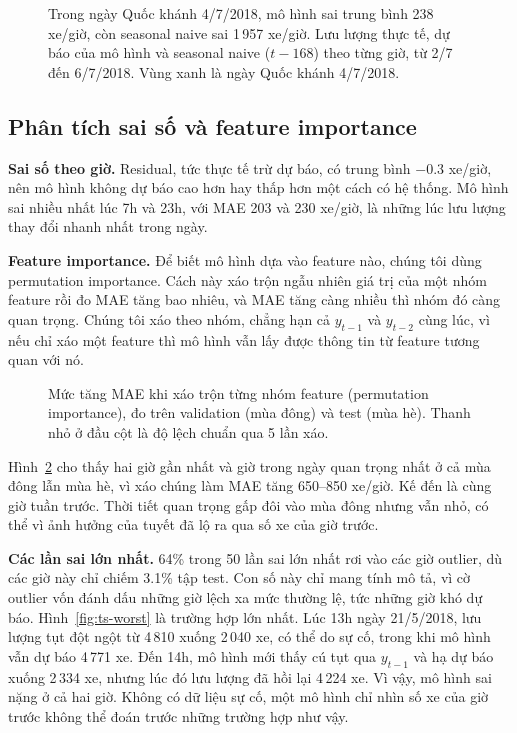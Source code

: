 \begin{figure}[H]
\centering
{}
\caption{Trong ngày Quốc khánh 4/7/2018, mô hình sai trung bình 238 xe/giờ, còn seasonal naive sai 1\,957 xe/giờ. Lưu lượng thực tế,
dự báo của mô hình và seasonal naive ($t-168$) theo từng giờ, từ 2/7 đến 6/7/2018. Vùng xanh là ngày Quốc
khánh 4/7/2018.}
\label{fig:ts-holiday-forecast}
\end{figure}

\subsection{Phân tích sai số và feature importance}
\label{sec:ts-errors}
\textbf{Sai số theo giờ.} Residual, tức thực tế trừ dự báo, có trung bình $-0.3$ xe/giờ, nên mô hình không dự báo cao hơn hay thấp hơn một
cách có hệ thống. Mô hình sai nhiều nhất lúc 7h và 23h, với MAE 203 và 230 xe/giờ, là những lúc lưu lượng thay đổi nhanh nhất trong ngày.

\textbf{Feature importance.} Để biết mô hình dựa vào feature nào, chúng tôi dùng permutation importance. Cách này xáo trộn ngẫu nhiên giá trị
của một nhóm feature rồi đo MAE tăng bao nhiêu, và MAE tăng càng nhiều thì nhóm đó càng quan trọng. Chúng tôi xáo theo nhóm, chẳng hạn cả
$y_{t-1}$ và $y_{t-2}$ cùng lúc, vì nếu chỉ xáo một feature thì mô hình vẫn lấy được thông tin từ feature tương quan với nó.

\begin{figure}[H]
\centering
{}
\caption{Mức tăng MAE khi xáo trộn từng nhóm feature (permutation importance), đo trên validation (mùa đông) và test (mùa hè). Thanh
nhỏ ở đầu cột là độ lệch chuẩn qua 5 lần xáo.}
\label{fig:ts-importance}
\end{figure}

Hình~\ref{fig:ts-importance} cho thấy hai giờ gần nhất và giờ trong ngày quan trọng nhất ở cả mùa đông lẫn mùa hè, vì xáo chúng làm MAE tăng
650--850 xe/giờ. Kế đến là cùng giờ tuần trước. Thời tiết quan trọng gấp đôi vào mùa đông nhưng vẫn nhỏ, có thể vì ảnh hưởng của tuyết đã lộ ra
qua số xe của giờ trước.

\textbf{Các lần sai lớn nhất.} 64\% trong 50 lần sai lớn nhất rơi vào các giờ outlier, dù các giờ này chỉ chiếm 3.1\% tập test. Con
số này chỉ mang tính mô tả, vì cờ outlier vốn đánh dấu những giờ lệch xa mức thường lệ, tức những giờ khó dự báo.
Hình~\ref{fig:ts-worst} là trường hợp lớn nhất. Lúc 13h ngày 21/5/2018, lưu lượng tụt đột ngột từ 4\,810 xuống 2\,040 xe, có thể do sự cố,
trong khi mô hình vẫn dự báo 4\,771 xe. Đến 14h, mô hình mới thấy cú tụt qua $y_{t-1}$ và hạ dự báo xuống 2\,334 xe, nhưng lúc đó lưu lượng
đã hồi lại 4\,224 xe. Vì vậy, mô hình sai nặng ở cả hai giờ. Không có dữ liệu sự cố, một mô hình chỉ nhìn số xe của giờ trước không thể đoán
trước những trường hợp như vậy.

